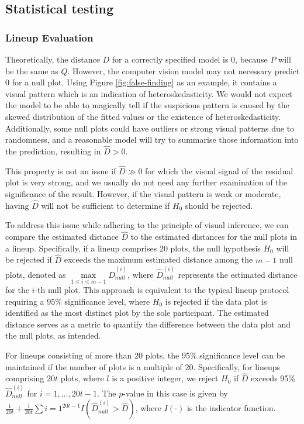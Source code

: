 \documentclass[]{interact}
\theoremstyle{plain}%
\theoremstyle{definition}
\theoremstyle{remark}
\begin{document}
\subsection{Statistical testing}\label{statistical-testing}

\subsubsection{Lineup Evaluation}\label{lineup-evaluation}

Theoretically, the distance \(D\) for a correctly specified model is
\(0\), because \(P\) will be the same as \(Q\). However, the computer
vision model may not necessary predict \(0\) for a null plot. Using
Figure \ref{fig:false-finding} as an example, it contains a visual
pattern which is an indication of heteroskedasticity. We would not
expect the model to be able to magically tell if the suspicious pattern
is caused by the skewed distribution of the fitted values or the
existence of heteroskedasticity. Additionally, some null plots could
have outliers or strong visual patterns due to randomness, and a
reasonable model will try to summarise those information into the
prediction, resulting in \(\hat{D} > 0\).

This property is not an issue if \(\hat{D} \gg 0\) for which the visual
signal of the residual plot is very strong, and we usually do not need
any further examination of the significance of the result. However, if
the visual pattern is weak or moderate, having \(\hat{D}\) will not be
sufficient to determine if \(H_0\) should be rejected.

To address this issue while adhering to the principle of visual
inference, we can compare the estimated distance \(\hat{D}\) to the
estimated distances for the null plots in a lineup. Specifically, if a
lineup comprises 20 plots, the null hypothesis \(H_0\) will be rejected
if \(\hat{D}\) exceeds the maximum estimated distance among the
\(m - 1\) null plots, denoted as
\(\max\limits_{1 \leq i \leq m-1} {\hat{D}_{null}^{(i)}}\), where
\(\hat{D}_{null}^{(i)}\) represents the estimated distance for the
\(i\)-th null plot. This approach is equivalent to the typical lineup
protocol requiring a 95\% significance level, where \(H_0\) is rejected
if the data plot is identified as the most distinct plot by the sole
participant. The estimated distance serves as a metric to quantify the
difference between the data plot and the null plots, as intended.

For lineups consisting of more than 20 plots, the 95\% significance
level can be maintained if the number of plots is a multiple of 20.
Specifically, for lineups comprising \(20t\) plots, where \(l\) is a
positive integer, we reject \(H_0\) if \(\hat{D}\) exceeds 95\%
\({\hat{D}_{null}^{(i)}}\) for \(i = 1, \ldots, 20t-1\). The \(p\)-value
in this case is given by
\(\frac{1}{20t} + \frac{1}{20t}\sum{i=1}^{20t-1} I\left(\hat{D}_{null}^{(i)} > \hat{D}\right)\),
where \(I(\cdot)\) is the indicator function.
\end{document}
